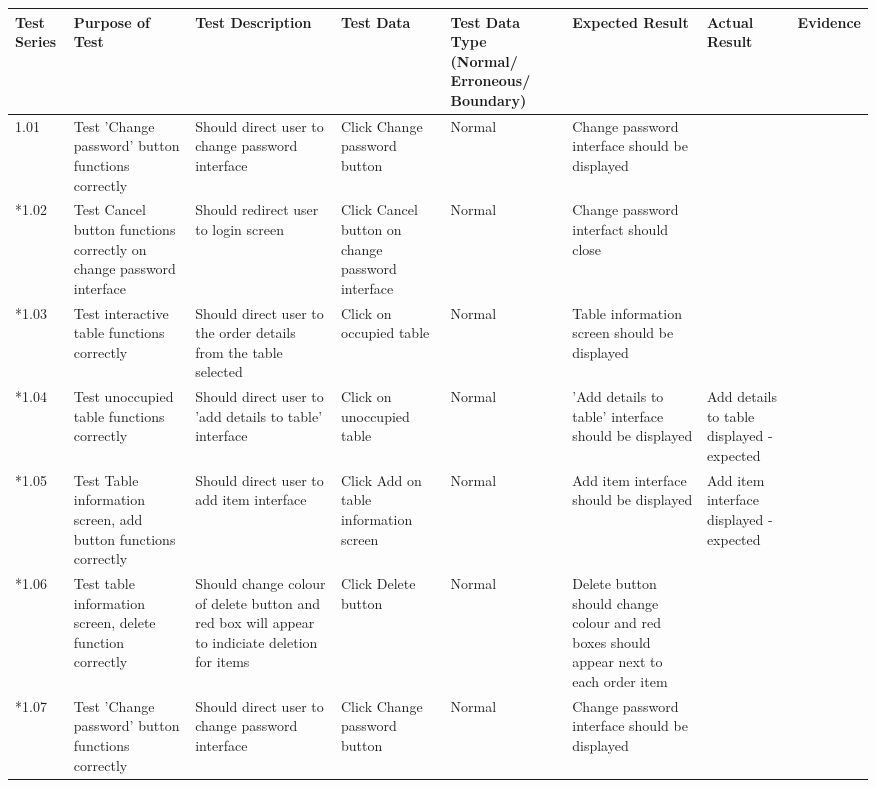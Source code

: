 \begin{landscape}
\begin{center}
    \begin{longtable}{|p{1.5cm}|p{2.5cm}|p{2.5cm}|p{2cm}|p{2cm}|p{2cm}|p{2cm}|p{2cm}|}
        \hline
        \textbf{Test Series} & \textbf{Purpose of Test} & \textbf{Test Description} & \textbf{Test Data} & \textbf{Test Data Type (Normal/ Erroneous/ Boundary)} & \textbf{Expected Result} & \textbf{Actual Result} & \textbf{Evidence}\\ \hline
        \rowcolor{gray}1.01 & Test 'Change password' button functions correctly & Should direct user to change password interface  & Click Change password button & Normal & Change password interface should be displayed &  &  \\ \hline
         \rowcolor{gray}*1.02 & Test Cancel button functions correctly on change password interface & Should redirect user to login screen  & Click Cancel button on change password interface & Normal & Change password interfact should close &  &  \\ \hline
         \rowcolor{gray}*1.03 & Test interactive table functions correctly & Should direct user to the order details from the table selected  & Click on occupied table & Normal & Table  information screen should be displayed &  &  \\ \hline
        \rowcolor{gray} *1.04 & Test unoccupied table functions correctly & Should direct user to 'add details to table'  interface  & Click on unoccupied table & Normal & 'Add details to table' interface should be displayed & Add details to table displayed - expected &  \\ \hline
        \rowcolor{gray} *1.05 & Test Table information screen, add button functions correctly & Should direct user to add item  interface  & Click Add on table information screen & Normal & Add item interface should be displayed & Add item interface displayed - expected  &  \\ \hline
        \rowcolor{gray} *1.06 & Test table information screen, delete function correctly & Should change colour of delete button and red box will appear to indiciate deletion for items  & Click Delete button & Normal & Delete button should change colour and red boxes should appear next to each order item &  &  \\ \hline
        \rowcolor{gray} *1.07 & Test 'Change password' button functions correctly & Should direct user to change password interface  & Click Change password button & Normal & Change password interface should be displayed &  &  \\ \hline

\end{longtable}
\end{center}
\end{landscape}

